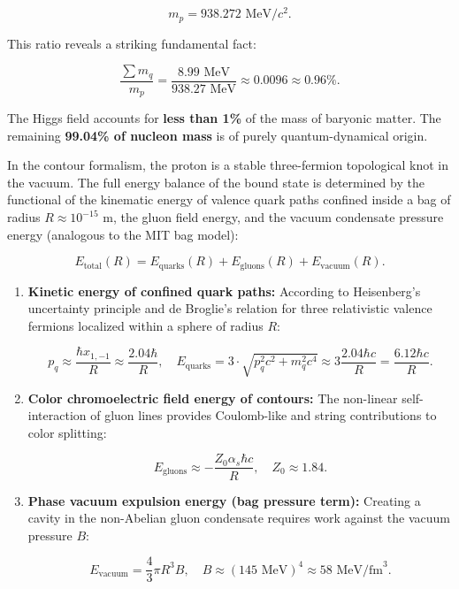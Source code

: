 \begin{equation}\label{eq:2.3.41}\tag{2.3.41}
m_p = 938.272\text{ MeV}/c^2.
\end{equation}

This ratio reveals a striking fundamental fact:

\begin{equation}\label{eq:2.3.42}\tag{2.3.42}
\frac{\sum m_q}{m_p} = \frac{8.99\text{ MeV}}{938.27\text{ MeV}} \approx 0.0096 \approx 0.96\%.
\end{equation}

The Higgs field accounts for \textbf{less than 1\%} of the mass of baryonic matter. The remaining \textbf{99.04\% of nucleon mass} is of purely quantum-dynamical origin.

In the contour formalism, the proton is a stable three-fermion topological knot in the vacuum. The full energy balance of the bound state is determined by the functional of the kinematic energy of valence quark paths confined inside a bag of radius $R \approx 10^{-15}\text{ m}$, the gluon field energy, and the vacuum condensate pressure energy (analogous to the MIT bag model):

\begin{equation}\label{eq:2.3.43}\tag{2.3.43}
E_{\text{total}}(R) = E_{\text{quarks}}(R) + E_{\text{gluons}}(R) + E_{\text{vacuum}}(R).
\end{equation}

\begin{enumerate}
\item \textbf{Kinetic energy of confined quark paths:}  
According to Heisenberg's uncertainty principle and de Broglie's relation for three relativistic valence fermions localized within a sphere of radius $R$:

\begin{equation}\label{eq:2.3.44}\tag{2.3.44}
p_q \approx \frac{\hbar x_{1,-1}}{R} \approx \frac{2.04 \hbar}{R}, \quad E_{\text{quarks}} = 3 \cdot \sqrt{p_q^2 c^2 + m_q^2 c^4} \approx 3 \frac{2.04 \hbar c}{R} = \frac{6.12 \hbar c}{R}.
\end{equation}

\item \textbf{Color chromoelectric field energy of contours:}  
The non-linear self-interaction of gluon lines provides Coulomb-like and string contributions to color splitting:

\begin{equation}\label{eq:2.3.45}\tag{2.3.45}
E_{\text{gluons}} \approx - \frac{Z_0 \alpha_s \hbar c}{R}, \quad Z_0 \approx 1.84.
\end{equation}

\item \textbf{Phase vacuum expulsion energy (bag pressure term):}  
Creating a cavity in the non-Abelian gluon condensate requires work against the vacuum pressure $B$:

\begin{equation}\label{eq:2.3.46}\tag{2.3.46}
E_{\text{vacuum}} = \frac{4}{3}\pi R^3 B, \quad B \approx (145\text{ MeV})^4 \approx 58\text{ MeV/fm}^3.
\end{equation}
\end{enumerate}

